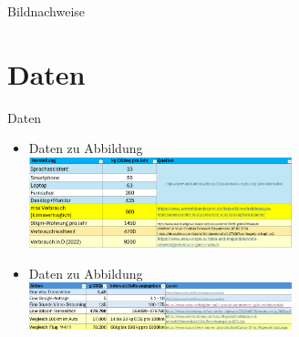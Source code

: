 \begin{appendix}
\begin{frame}{Bildnachweise}
\end{frame}

\section{Daten}

\begin{frame}{Daten}
\label{daten1}
\begin{itemize}

	\item[] Daten zu Abbildung 	\\
				\includegraphics[width=0.60\textwidth]{../Figures/CO2eq_HerstellungDigitalerProdukte.png}

	\item[] Daten zu Abbildung 	\\
				\includegraphics[width=0.60\textwidth]{../Figures/CO2eq_DigitalerAktionen.png}
				
				
\end{itemize}
\end{frame}

\end{appendix}